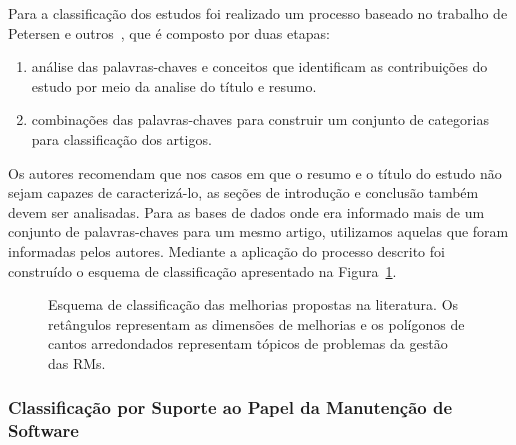 Para a classificação dos estudos foi realizado um processo baseado no trabalho
de Petersen e outros~\cite{Petersen2008}, que é composto por duas etapas:

\begin{enumerate}[I]
	\item análise das palavras-chaves e conceitos que
		identificam as contribuições do estudo por meio da analise do título e
		resumo.
	\item combinações das palavras-chaves para construir um conjunto de
		categorias para classificação dos artigos.
\end{enumerate}

Os autores recomendam que nos casos em que o resumo e o título do estudo não
sejam capazes de caracterizá-lo, as seções de introdução e conclusão também
devem ser analisadas. Para as bases de dados onde era informado mais de um
conjunto de palavras-chaves para um mesmo artigo, utilizamos aquelas que foram
informadas pelos autores. Mediante a aplicação do processo descrito foi
construído o esquema de classificação apresentado na
Figura~\ref{fig:diagrama-esquema-dimensao-melhorias}.

\begin{figure}[tb] \centering
	\caption{Esquema de classificação das melhorias propostas na literatura. Os
		retângulos representam as dimensões de melhorias e os polígonos de
		cantos arredondados representam tópicos de problemas da gestão das
		RMs.}
\label{fig:diagrama-esquema-dimensao-melhorias}
\end{figure}

\subsubsection{Classificação por Suporte ao Papel da Manutenção de Software}
\label{subsubsec:map-esquema-suporte-papel-man}

